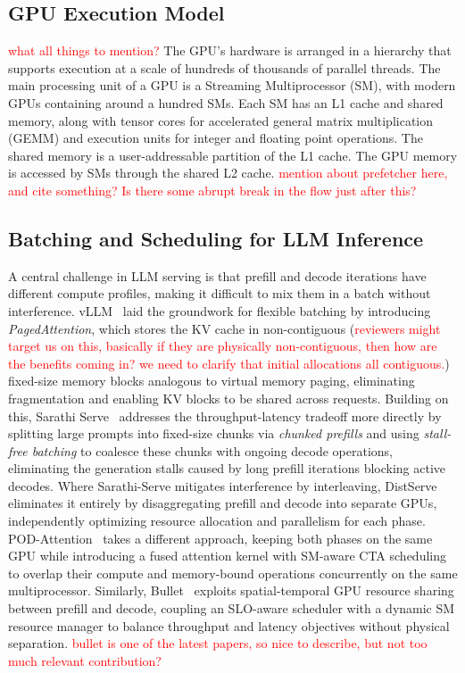\subsection{GPU Execution Model}
\textcolor{red}{what all things to mention?}
The GPU's hardware is arranged in a hierarchy that supports execution at a scale of hundreds of thousands of parallel threads. The main processing unit of a GPU is a Streaming Multiprocessor (SM), with modern GPUs containing around a hundred SMs. Each SM has an L1 cache and shared memory, along with tensor cores for accelerated general matrix multiplication (GEMM) and execution units for integer and floating point operations. The shared memory is a user-addressable partition of the L1 cache. The GPU memory is accessed by SMs through the shared L2 cache. \textcolor{red}{mention about prefetcher here, and cite something? Is there some abrupt break in the flow just after this?}


\subsection{Batching and Scheduling for LLM Inference}
A central challenge in LLM serving is that prefill and decode iterations have different compute profiles, making it difficult to mix them in a batch without interference. vLLM~\cite{kwon2023efficient} laid the groundwork for flexible batching by introducing \textit{PagedAttention}, which stores the KV cache in non-contiguous (\textcolor{red}{reviewers might target us on this, basically if they are physically non-contiguous, then how are the benefits coming in? we need to clarify that initial allocations all contiguous.}) fixed-size memory blocks analogous to virtual memory paging, eliminating fragmentation and enabling KV blocks to be shared across requests. Building on this, Sarathi Serve~\cite{agrawal2024tamingthroughputlatencytradeoffllm} addresses the throughput-latency tradeoff more directly by splitting large prompts into fixed-size chunks via \textit{chunked prefills} and using \textit{stall-free batching} to coalesce these chunks with ongoing decode operations, eliminating the generation stalls caused by long prefill iterations blocking active decodes. Where Sarathi-Serve mitigates interference by interleaving, DistServe~\cite{zhong2024distservedisaggregatingprefilldecoding} eliminates it entirely by disaggregating prefill and decode into separate GPUs, independently optimizing resource allocation and parallelism for each phase. POD-Attention~\cite{Kamath_2025} takes a different approach, keeping both phases on the same GPU while introducing a fused attention kernel with SM-aware CTA scheduling to overlap their compute and memory-bound operations concurrently on the same multiprocessor. Similarly, Bullet~\cite{lin2025boostingllmservingspatialtemporal} exploits spatial-temporal GPU resource sharing between prefill and decode, coupling an SLO-aware scheduler with a dynamic SM resource manager to balance throughput and latency objectives without physical separation. \textcolor{red}{bullet is one of the latest papers, so nice to describe, but not too much relevant contribution?} 

